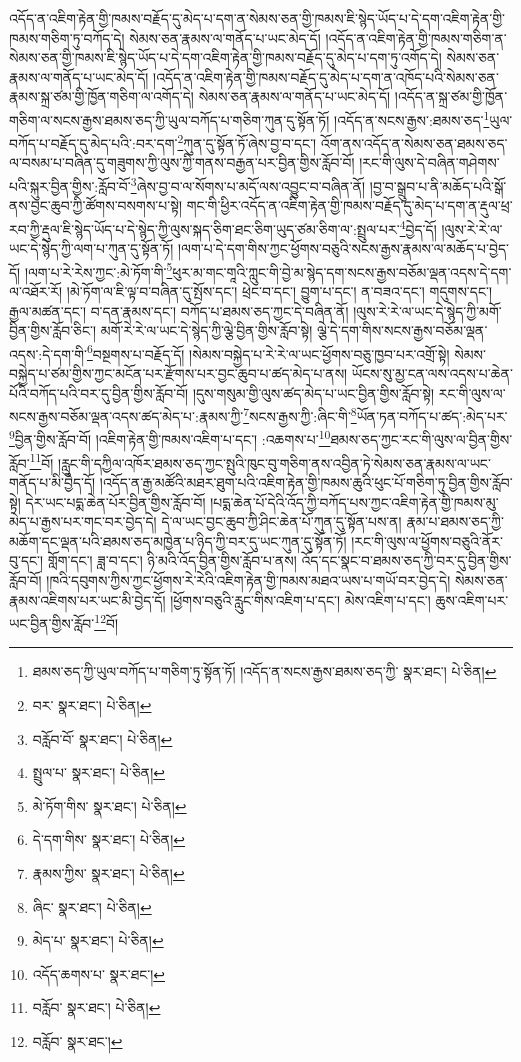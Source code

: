 འདོད་ན་འཇིག་རྟེན་གྱི་ཁམས་བརྗོད་དུ་མེད་པ་དག་ན་སེམས་ཅན་གྱི་ཁམས་ཇི་སྙེད་ཡོད་པ་དེ་དག་འཇིག་རྟེན་གྱི་ཁམས་གཅིག་ཏུ་བཀོད་དེ། སེམས་ཅན་རྣམས་ལ་གནོད་པ་ཡང་མེད་དོ། །འདོད་ན་འཇིག་རྟེན་གྱི་ཁམས་གཅིག་ན་སེམས་ཅན་གྱི་ཁམས་ཇི་སྙེད་ཡོད་པ་དེ་དག་འཇིག་རྟེན་གྱི་ཁམས་བརྗོད་དུ་མེད་པ་དག་ཏུ་འགོད་དེ། སེམས་ཅན་རྣམས་ལ་གནོད་པ་ཡང་མེད་དོ། །འདོད་ན་འཇིག་རྟེན་གྱི་ཁམས་བརྗོད་དུ་མེད་པ་དག་ན་འཁོད་པའི་སེམས་ཅན་རྣམས་སྐྲ་ཙམ་གྱི་ཁྱོན་གཅིག་ལ་འགོད་དེ། སེམས་ཅན་རྣམས་ལ་གནོད་པ་ཡང་མེད་དོ། །འདོད་ན་སྐྲ་ཙམ་གྱི་ཁྱོན་གཅིག་ལ་སངས་རྒྱས་ཐམས་ཅད་ཀྱི་ཡུལ་བཀོད་པ་གཅིག་ཀུན་དུ་སྟོན་ཏོ། །འདོད་ན་སངས་རྒྱས་:ཐམས་ཅད་\footnote{ཐམས་ཅད་ཀྱི་ཡུལ་བཀོད་པ་གཅིག་ཏུ་སྟོན་ཏོ། །འདོད་ན་སངས་རྒྱས་ཐམས་ཅད་ཀྱི་  སྣར་ཐང་།  པེ་ཅིན། }ཡུལ་བཀོད་པ་བརྗོད་དུ་མེད་པའི་:བར་དག་\footnote{བར་  སྣར་ཐང་།  པེ་ཅིན། }ཀུན་དུ་སྟོན་ཏོ་ཞེས་བྱ་བ་དང་། འོག་ནས་འདོད་ན་སེམས་ཅན་ཐམས་ཅད་ལ་བསམ་པ་བཞིན་དུ་གཟུགས་ཀྱི་ལུས་ཀྱི་གནས་བརྒྱན་པར་བྱིན་གྱིས་རློབ་བོ། །རང་གི་ལུས་དེ་བཞིན་གཤེགས་པའི་སྐུར་བྱིན་གྱིས་:རློབ་བོ་\footnote{བརློབ་བོ་  སྣར་ཐང་།  པེ་ཅིན། }ཞེས་བྱ་བ་ལ་སོགས་པ་མདོ་ལས་འབྱུང་བ་བཞིན་ནོ། །བྱ་བ་སྒྲུབ་པ་ནི་མཆོད་པའི་སྒོ་ནས་བྱང་ཆུབ་ཀྱི་ཚོགས་བསགས་པ་སྟེ། གང་གི་ཕྱིར་འདོད་ན་འཇིག་རྟེན་གྱི་ཁམས་བརྗོད་དུ་མེད་པ་དག་ན་རྡུལ་ཕྲ་རབ་ཀྱི་རྡུལ་ཇི་སྙེད་ཡོད་པ་དེ་སྙེད་ཀྱི་ལུས་སྐད་ཅིག་ཐང་ཅིག་ཡུད་ཙམ་ཅིག་ལ་:སྤྲུལ་པར་\footnote{སྤྲུལ་པ་  སྣར་ཐང་།  པེ་ཅིན། }བྱེད་དོ། །ལུས་རེ་རེ་ལ་ཡང་དེ་སྙེད་ཀྱི་ལག་པ་ཀུན་དུ་སྟོན་ཏོ། །ལག་པ་དེ་དག་གིས་ཀྱང་ཕྱོགས་བཅུའི་སངས་རྒྱས་རྣམས་ལ་མཆོད་པ་བྱེད་དོ། །ལག་པ་རེ་རེས་ཀྱང་:མེ་ཏོག་གི་\footnote{མེ་ཏོག་གིས་  སྣར་ཐང་།  པེ་ཅིན། }ཕུར་མ་གང་གཱའི་ཀླུང་གི་བྱེ་མ་སྙེད་དག་སངས་རྒྱས་བཅོམ་ལྡན་འདས་དེ་དག་ལ་འཐོར་རོ། །མེ་ཏོག་ལ་ཇི་ལྟ་བ་བཞིན་དུ་སྤོས་དང་། ཕྲེང་བ་དང་། བྱུག་པ་དང་། ན་བཟའ་དང་། གདུགས་དང་། རྒྱལ་མཚན་དང་། བ་དན་རྣམས་དང་། བཀོད་པ་ཐམས་ཅད་ཀྱང་དེ་བཞིན་ནོ། །ལུས་རེ་རེ་ལ་ཡང་དེ་སྙེད་ཀྱི་མགོ་བྱིན་གྱིས་རློབ་ཅིང་། མགོ་རེ་རེ་ལ་ཡང་དེ་སྙེད་ཀྱི་ལྕེ་བྱིན་གྱིས་རློབ་སྟེ། ལྕེ་དེ་དག་གིས་སངས་རྒྱས་བཅོམ་ལྡན་འདས་:དེ་དག་གི་\footnote{དེ་དག་གིས་  སྣར་ཐང་།  པེ་ཅིན། }བསྔགས་པ་བརྗོད་དོ། །སེམས་བསྐྱེད་པ་རེ་རེ་ལ་ཡང་ཕྱོགས་བཅུ་ཁྱབ་པར་འགྲོ་སྟེ། སེམས་བསྐྱེད་པ་ཙམ་གྱིས་ཀྱང་མངོན་པར་རྫོགས་པར་བྱང་ཆུབ་པ་ཚད་མེད་པ་ནས། ཡོངས་སུ་མྱ་ངན་ལས་འདས་པ་ཆེན་པོའི་བཀོད་པའི་བར་དུ་བྱིན་གྱིས་རློབ་བོ། །དུས་གསུམ་གྱི་ལུས་ཚད་མེད་པ་ཡང་བྱིན་གྱིས་རློབ་སྟེ། རང་གི་ལུས་ལ་སངས་རྒྱས་བཅོམ་ལྡན་འདས་ཚད་མེད་པ་:རྣམས་ཀྱི་\footnote{རྣམས་ཀྱིས་  སྣར་ཐང་།  པེ་ཅིན། }སངས་རྒྱས་ཀྱི་:ཞིང་གི་\footnote{ཞིང་  སྣར་ཐང་།  པེ་ཅིན། }ཡོན་ཏན་བཀོད་པ་ཚད་:མེད་པར་\footnote{མེད་པ་  སྣར་ཐང་།  པེ་ཅིན། }བྱིན་གྱིས་རློབ་བོ། །འཇིག་རྟེན་གྱི་ཁམས་འཇིག་པ་དང་། :འཆགས་པ་\footnote{འདོད་ཆགས་པ་  སྣར་ཐང་། }ཐམས་ཅད་ཀྱང་རང་གི་ལུས་ལ་བྱིན་གྱིས་རློབ་\footnote{བརློབ་  སྣར་ཐང་།  པེ་ཅིན། }བོ། །རླུང་གི་དཀྱིལ་འཁོར་ཐམས་ཅད་ཀྱང་སྤུའི་ཁུང་བུ་གཅིག་ནས་འབྱིན་ཏེ་སེམས་ཅན་རྣམས་ལ་ཡང་གནོད་པ་མི་བྱེད་དོ། །འདོད་ན་རྒྱ་མཚོའི་མཐར་ཐུག་པའི་འཇིག་རྟེན་གྱི་ཁམས་ཆུའི་ཕུང་པོ་གཅིག་ཏུ་བྱིན་གྱིས་རློབ་སྟེ། དེར་ཡང་པདྨ་ཆེན་པོར་བྱིན་གྱིས་རློབ་བོ། །པདྨ་ཆེན་པོ་དེའི་འོད་ཀྱི་བཀོད་པས་ཀྱང་འཇིག་རྟེན་གྱི་ཁམས་མུ་མེད་པ་རྒྱས་པར་གང་བར་བྱེད་དེ། དེ་ལ་ཡང་བྱང་ཆུབ་ཀྱི་ཤིང་ཆེན་པོ་ཀུན་དུ་སྟོན་པས་ན། རྣམ་པ་ཐམས་ཅད་ཀྱི་མཆོག་དང་ལྡན་པའི་ཐམས་ཅད་མཁྱེན་པ་ཉིད་ཀྱི་བར་དུ་ཡང་ཀུན་དུ་སྟོན་ཏོ། །རང་གི་ལུས་ལ་ཕྱོགས་བཅུའི་ནོར་བུ་དང་། གློག་དང་། ཟླ་བ་དང་། ཉི་མའི་འོད་བྱིན་གྱིས་རློབ་པ་ནས། འོད་དང་སྣང་བ་ཐམས་ཅད་ཀྱི་བར་དུ་བྱིན་གྱིས་རློབ་བོ། །ཁའི་དབུགས་ཀྱིས་ཀྱང་ཕྱོགས་རེ་རེའི་འཇིག་རྟེན་གྱི་ཁམས་མཐའ་ཡས་པ་གཡོ་བར་བྱེད་དེ། སེམས་ཅན་རྣམས་འཇིགས་པར་ཡང་མི་བྱེད་དོ། །ཕྱོགས་བཅུའི་རླུང་གིས་འཇིག་པ་དང་། མེས་འཇིག་པ་དང་། ཆུས་འཇིག་པར་ཡང་བྱིན་གྱིས་རློབ་\footnote{བརློབ་  སྣར་ཐང་། }བོ། 